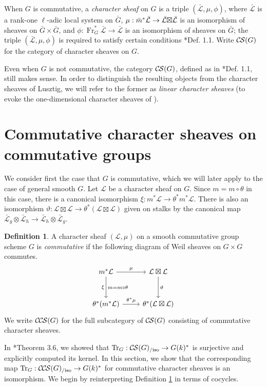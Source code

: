 \documentclass[10pt]{amsart}
\theoremstyle{plain}
\theoremstyle{definition}
\newtheorem{definition}[theorem]{Definition}
\newcommand{\Frob}[1]{\operatorname{Fr}_{#1}}
\DeclareMathOperator{\Tr}{Tr}
\newcommand{\TrFrob}[1]{\Tr_{#1}}
\newcommand{\cs}[1]{{\mathcal{#1}}}
\newcommand{\gcs}[1]{{\mathcal{\bar #1}}}
\newcommand{\CS}{{\mathcal{C\hskip-0.8pt S}}}
\newcommand{\CCS}{{\mathcal{C\hskip-.8pt C\hskip-0.8pt S}}}
\newcommand{\CSiso}[1]{\CS(#1)_{/\text{iso}}}
\newcommand{\CCSiso}[1]{\CCS(#1)_{/\text{iso}}}
\newcommand{\bm}{\bar{m}}
\newcommand{\bG}{\bar{G}}
\newcommand{\tight}[3]{\hspace{-#1pt}{#2}\hspace{-#3pt}}
\newcommand{\LxL}{\text{$\gcs{L} \tight{0}{\boxtimes}{0} \gcs{L}$}}
\begin{document}
When $G$ is commutative, a \emph{character sheaf} on $G$ is a triple $(\gcs{L}, \mu, \phi)$,
where $\gcs{L}$ is a rank-one $\ell$-adic local system on $\bG$, 
$\mu : \bm^* \gcs{L} \to \LxL$ is an isomorphism
of sheaves on $\bG \times \bG$, 
and $\phi : \Frob{G}^* \gcs{L} \to \gcs{L}$ is an isomorphism of sheaves on $\bG$;
the triple $(\gcs{L}, \mu, \phi)$ is required to satisfy certain conditions \cite{cunningham-roe:13a}*{Def. 1.1}.
Write $\CS(G)$ for the category of character sheaves on $G$.

Even when $G$ is not commutative, the category $\CS(G)$, defined as in \cite{cunningham-roe:13a}*{Def. 1.1},
still makes sense.  In order to distinguish the resulting objects from
the character sheaves of Lusztig, we will refer to the former as \emph{linear character sheaves}
(to evoke the one-dimensional character sheaves of \cite{kamgarpour:09a}).

\section{Commutative character sheaves on commutative groups}\label{sec:comcom}

We consider first the case that $G$ is commutative, which we will later apply to the case of general smooth $G$.
Let $\cs{L}$ be a character sheaf on $G$.  Since $m = m \circ \theta$ in this case,
there is a canonical isomorphism $\xi : m^* \cs{L} \to \theta^* m^* \cs{L}$.
There is also an isomorphism $\vartheta : \cs{L}\boxtimes\cs{L} \to \theta^*(\cs{L}\boxtimes\cs{L})$
given on stalks by the canonical map $\gcs{L}_{g} \otimes \gcs{L}_{h} \to \gcs{L}_{h} \otimes \gcs{L}_{g}$.

\begin{definition}\label{def:CCScom}
A character sheaf $(\cs{L}, \mu)$ on a smooth commutative group scheme $G$ is \emph{commutative}
if the following diagram of Weil sheaves on $G \times G$ commutes.
  \[
  \begin{tikzcd}[row sep=30]
   m^*\cs{L} \arrow{d}[swap]{\xi}{m= m\circ\theta} \arrow{r}{\mu} & \cs{L}\boxtimes\cs{L} \arrow{d}{\vartheta}\\
   \theta^*(m^*\cs{L}) \arrow{r}{{\theta}^*\mu} &  \theta^*(\cs{L}\boxtimes\cs{L})
  \end{tikzcd}
  \]
We write $\CCS(G)$ for the full subcategory of $\CS(G)$ consisting of commutative character sheaves.
 \end{definition}

In \cite{cunningham-roe:13a}*{Theorem 3.6}, we showed that $\TrFrob{G} : \CSiso{G} \to G(k)^*$ is surjective and
explicitly computed its kernel.  In this section, we show that the corresponding map
$\TrFrob{G} : \CCSiso{G} \to G(k)^*$ for commutative character sheaves is an isomorphism.
We begin by reinterpreting Definition \ref{def:CCScom} in terms of cocycles.
\end{document}
